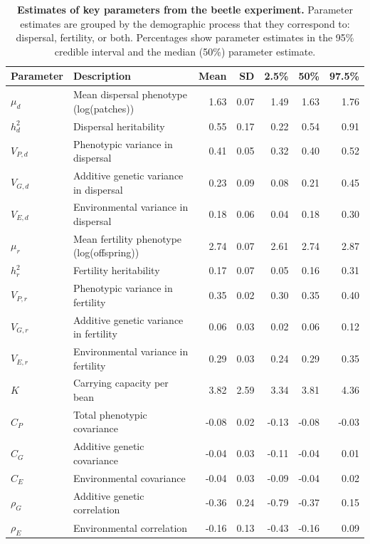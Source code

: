 \documentclass[11pt]{article}
\begin{document}
\renewcommand{\thetable}{\arabic{table}}
\setcounter{table}{0}

\newpage{}
\begin{table}[h]
\centering
\label{Estimates of key parameters from the beetle experiment}
\caption[Estimates of key parameters from the beetle experiment]{\textbf{Estimates of key parameters from the beetle experiment.} Parameter estimates are grouped by the demographic process that they correspond to: dispersal, fertility, or both. Percentages show parameter estimates in the 95\% credible interval and the median (50\%) parameter estimate.}\label{corr:estimates}\vspace{0.1in}
\begin{tabularx}{0.95\linewidth}{lXrrrrr}
\toprule
Parameter   & Description                               & Mean & SD   & 2.5\% & 50\% & 97.5\% \\ \midrule
$\mu_{d}$   & Mean dispersal phenotype (log(patches)) & 1.63 & 0.07 & 1.49   & 1.63 & 1.76   \\
$h^{2}_{d}$ & Dispersal heritability              & 0.55 & 0.17 & 0.22   & 0.54 & 0.91   \\
$V_{P,d}$   & Phenotypic variance in dispersal & 0.41 & 0.05 & 0.32   & 0.40 & 0.52   \\
$V_{G,d}$   & Additive genetic variance in dispersal & 0.23 & 0.09 & 0.08   & 0.21 & 0.45   \\
$V_{E,d}$   & Environmental variance in dispersal    & 0.18 & 0.06 & 0.04   & 0.18 & 0.30   \\ \midrule
$\mu_{r}$   & Mean fertility phenotype (log(offspring)) & 2.74 & 0.07 & 2.61   & 2.74 & 2.87   \\
$h^{2}_{r}$ & Fertility heritability              & 0.17 & 0.07 & 0.05   & 0.16 & 0.31   \\
$V_{P,r}$   & Phenotypic variance in fertility & 0.35 & 0.02 & 0.30   & 0.35 & 0.40   \\
$V_{G,r}$   & Additive genetic variance in fertility & 0.06 & 0.03 & 0.02   & 0.06 & 0.12   \\
$V_{E,r}$   & Environmental variance in fertility    & 0.29 & 0.03 & 0.24   & 0.29 & 0.35   \\
$K$         & Carrying capacity per bean              & 3.82 & 2.59 & 3.34   & 3.81 & 4.36   \\ \midrule
$C_{P}$     & Total phenotypic covariance    &-0.08 & 0.02 &-0.13   &-0.08 &-0.03   \\
$C_{G}$     & Additive genetic covariance &-0.04 & 0.03 &-0.11   &-0.04 & 0.01   \\
$C_{E}$     & Environmental covariance   &-0.04 & 0.03 &-0.09   &-0.04 & 0.02   \\
$\rho_{G}$  & Additive genetic correlation  &-0.36 & 0.24 &-0.79   &-0.37 & 0.15   \\
$\rho_{E}$  & Environmental correlation     &-0.16 & 0.13 &-0.43   &-0.16 & 0.09   \\
\bottomrule
\end{tabularx}
\end{table}
\end{document}
